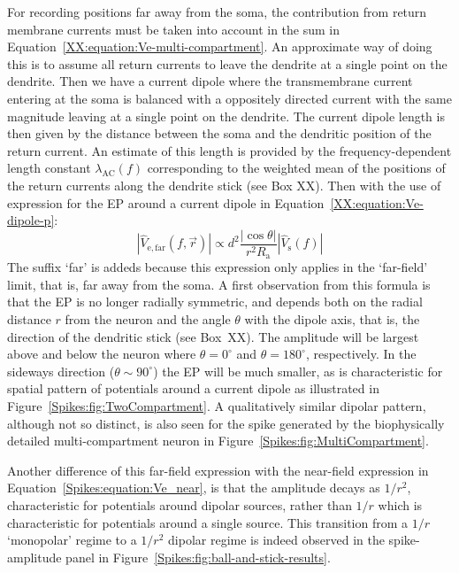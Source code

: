 For recording positions far away from the soma, the contribution from return membrane currents must be taken into
account in the sum in Equation~\ref{XX:equation:Ve-multi-compartment}. An approximate way of doing this is to
assume all return currents to leave the dendrite at a single point on the dendrite. Then we have 
a current dipole where the transmembrane current entering at the soma is balanced with a oppositely directed current
with the same magnitude leaving at a single point on the dendrite. The current dipole length is then given by the distance
between the soma and the dendritic position of the return current. An estimate of this length is provided by the 
frequency-dependent length constant  $\lambda_\mathrm{AC}(f)$  corresponding to the weighted mean of the positions of the return currents along
the dendrite stick (see Box XX). 
Then with the use of expression for the EP around a current dipole in 
Equation~\ref{XX:equation:Ve-dipole-p}:
\begin{equation}
  |\hat{V}_\mathrm{e,far}(f,\vec{r})|  \propto d^{2} \frac{|\cos \theta| }{r^2  R_\mathrm{a}}  |\hat{V}_\mathrm{s}(f)| 
  \label{Spikes:equation:Ve_far}
\end{equation}
The suffix `far' is addeds because this expression only applies in the `far-field' limit, that is,
far away from the soma. A first observation from this formula is that the EP is no longer radially symmetric, and depends both on the radial distance $r$ from the neuron and  the angle $\theta$ with the dipole axis, that is, the direction of the dendritic stick  (see Box~XX). The amplitude will be largest
above and below the neuron where $\theta=0^\circ$ and $\theta=180^\circ$, respectively. In the sideways direction 
($\theta \sim 90^\circ$) the EP will be much smaller, as is characteristic for spatial pattern of potentials around a current
dipole as illustrated in Figure~\ref{Spikes:fig:TwoCompartment}. A qualitatively similar dipolar pattern, although not so distinct,
is also seen for the spike generated by the biophysically detailed multi-compartment neuron in Figure~\ref{Spikes:fig:MultiCompartment}.

Another difference of this far-field expression with the near-field expression in Equation~\ref{Spikes:equation:Ve_near}, is that the
amplitude decays as $1/r^2$, characteristic for potentials around dipolar sources, rather than $1/r$ which is characteristic for potentials around 
a single source. This transition from a $1/r$ `monopolar' regime to a $1/r^2$ dipolar regime is indeed observed in
the spike-amplitude panel in Figure~\ref{Spikes:fig:ball-and-stick-results}.


